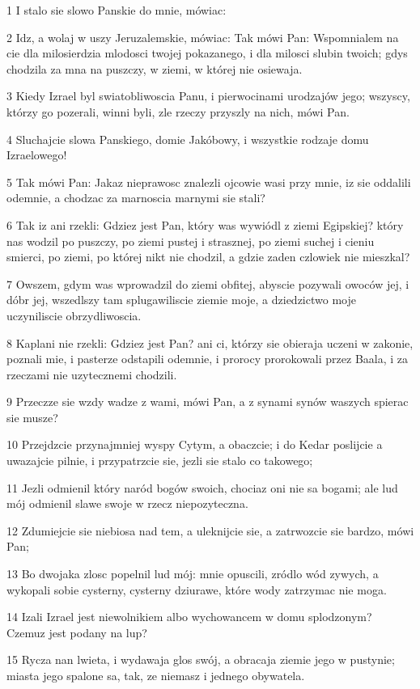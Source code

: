 \par 1 I stalo sie slowo Panskie do mnie, mówiac:
\par 2 Idz, a wolaj w uszy Jeruzalemskie, mówiac: Tak mówi Pan: Wspomnialem na cie dla milosierdzia mlodosci twojej pokazanego, i dla milosci slubin twoich; gdys chodzila za mna na puszczy, w ziemi, w której nie osiewaja.
\par 3 Kiedy Izrael byl swiatobliwoscia Panu, i pierwocinami urodzajów jego; wszyscy, którzy go pozerali, winni byli, zle rzeczy przyszly na nich, mówi Pan.
\par 4 Sluchajcie slowa Panskiego, domie Jakóbowy, i wszystkie rodzaje domu Izraelowego!
\par 5 Tak mówi Pan: Jakaz nieprawosc znalezli ojcowie wasi przy mnie, iz sie oddalili odemnie, a chodzac za marnoscia marnymi sie stali?
\par 6 Tak iz ani rzekli: Gdziez jest Pan, który was wywiódl z ziemi Egipskiej? który nas wodzil po puszczy, po ziemi pustej i strasznej, po ziemi suchej i cieniu smierci, po ziemi, po której nikt nie chodzil, a gdzie zaden czlowiek nie mieszkal?
\par 7 Owszem, gdym was wprowadzil do ziemi obfitej, abyscie pozywali owoców jej, i dóbr jej, wszedlszy tam splugawiliscie ziemie moje, a dziedzictwo moje uczyniliscie obrzydliwoscia.
\par 8 Kaplani nie rzekli: Gdziez jest Pan? ani ci, którzy sie obieraja uczeni w zakonie, poznali mie, i pasterze odstapili odemnie, i prorocy prorokowali przez Baala, i za rzeczami nie uzytecznemi chodzili.
\par 9 Przeczze sie wzdy wadze z wami, mówi Pan, a z synami synów waszych spierac sie musze?
\par 10 Przejdzcie przynajmniej wyspy Cytym, a obaczcie; i do Kedar poslijcie a uwazajcie pilnie, i przypatrzcie sie, jezli sie stalo co takowego;
\par 11 Jezli odmienil który naród bogów swoich, chociaz oni nie sa bogami; ale lud mój odmienil slawe swoje w rzecz niepozyteczna.
\par 12 Zdumiejcie sie niebiosa nad tem, a uleknijcie sie, a zatrwozcie sie bardzo, mówi Pan;
\par 13 Bo dwojaka zlosc popelnil lud mój: mnie opuscili, zródlo wód zywych, a wykopali sobie cysterny, cysterny dziurawe, które wody zatrzymac nie moga.
\par 14 Izali Izrael jest niewolnikiem albo wychowancem w domu splodzonym? Czemuz jest podany na lup?
\par 15 Rycza nan lwieta, i wydawaja glos swój, a obracaja ziemie jego w pustynie; miasta jego spalone sa, tak, ze niemasz i jednego obywatela.
